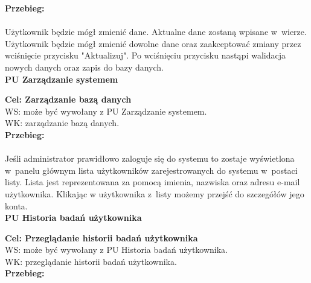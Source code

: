 \documentclass[12pt, letterpaper]{article}
\begin{document}
		\textbf{Przebieg:}
\paragraph{}Użytkownik będzie mógł zmienić dane. Aktualne dane zostaną wpisane w~wierze. Użytkownik będzie mógł zmienić dowolne dane oraz zaakceptować zmiany przez wciśnięcie przycisku "Aktualizuj". Po wciśnięciu przycisku nastąpi walidacja nowych danych oraz zapis do bazy danych.\\
		
		
		\textbf{PU Zarządzanie systemem}
		
		\quad
		
		\textbf{Cel: Zarządzanie bazą danych}\\
		
		WS: może być wywołany z PU Zarządzanie systemem.\\
		
		WK: zarządzanie bazą danych. \\
		
		\textbf{Przebieg:}
\paragraph{}Jeśli administrator prawidłowo zaloguje się do systemu to zostaje wyświetlona w~panelu głównym lista użytkowników zarejestrowanych do systemu w~postaci listy. Lista jest reprezentowana za pomocą imienia, nazwiska oraz adresu e-mail użytkownika. Klikając w użytkownika z~listy możemy przejść do szczegółów jego konta.\\	
		
		
		\textbf{PU Historia badań użytkownika}
		
		\quad
		
		\textbf{Cel: Przeglądanie historii badań użytkownika}\\
		
		WS: może być wywołany z PU Historia badań użytkownika.\\
		
		WK: przeglądanie historii badań użytkownika. \\
		
		\textbf{Przebieg:}
\end{document}
